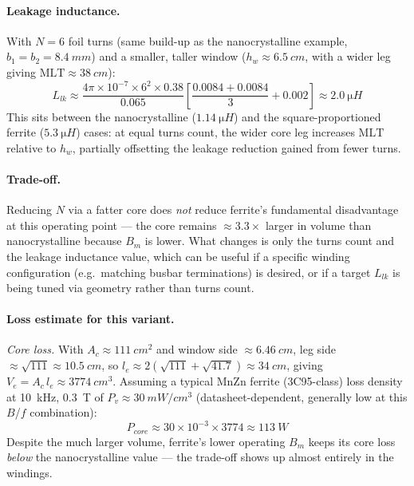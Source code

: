 \documentclass[11pt,a4paper]{article}
\begin{document}
\paragraph{Leakage inductance.} With $N=6$ foil turns (same build-up as the
nanocrystalline example, $b_1=b_2=\SI{8.4}{mm}$) and a smaller, taller window
($h_w\approx\SI{6.5}{cm}$, with a wider leg giving $\mathrm{MLT}\approx\SI{38}{cm}$):
\begin{equation}
    L_{lk} \approx \frac{4\pi\times10^{-7}\times6^2\times0.38}{0.065}
    \left[\frac{0.0084+0.0084}{3}+0.002\right] \approx \SI{2.0}{\micro H}
\end{equation}
This sits between the nanocrystalline ($\SI{1.14}{\micro H}$) and the
square-proportioned ferrite ($\SI{5.3}{\micro H}$) cases: at equal turns count,
the wider core leg increases $\mathrm{MLT}$ relative to $h_w$, partially offsetting
the leakage reduction gained from fewer turns.

\paragraph{Trade-off.} Reducing $N$ via a fatter core does \emph{not} reduce
ferrite's fundamental disadvantage at this operating point — the core remains
$\approx 3.3\times$ larger in volume than nanocrystalline because $B_m$ is lower.
What changes is only the turns count and the leakage inductance value, which can
be useful if a specific winding configuration (e.g.\ matching busbar
terminations) is desired, or if a target $L_{lk}$ is being tuned via geometry
rather than turns count.

\paragraph{Loss estimate for this variant.}
\textit{Core loss.} With $A_c\approx\SI{111}{cm^2}$ and window side
$\approx\SI{6.46}{cm}$, leg side $\approx\sqrt{111}\approx\SI{10.5}{cm}$, so
$l_e\approx2(\sqrt{111}+\sqrt{41.7})\approx\SI{34}{cm}$, giving
$V_e=A_c\,l_e\approx\SI{3774}{cm^3}$. Assuming a typical MnZn ferrite (3C95-class)
loss density at \SI{10}{kHz}, \SI{0.3}{T} of $P_v\approx\SI{30}{mW/cm^3}$
(datasheet-dependent, generally low at this $B$/$f$ combination):
\begin{equation}
    P_{core} \approx 30\times10^{-3} \times 3774 \approx \SI{113}{W}
\end{equation}
Despite the much larger volume, ferrite's lower operating $B_m$ keeps its core
loss \emph{below} the nanocrystalline value — the trade-off shows up almost
entirely in the windings.
\end{document}

